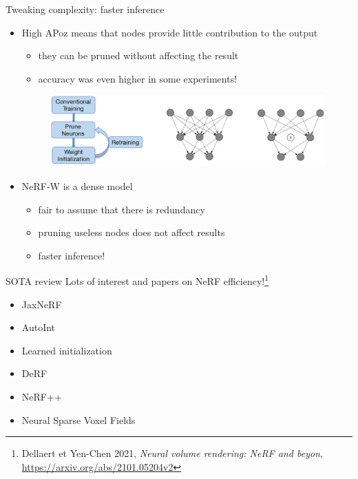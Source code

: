 \documentclass[aspectratio=1610]{beamer}
\begin{document}
\begin{frame}{Tweaking complexity: faster inference}
    \begin{itemize}
        \item High APoz means that nodes provide little contribution to the output
        \begin{itemize}
            \item they can be pruned without affecting the result
            \item accuracy was even higher in some experiments!
        \end{itemize}
        \bigskip
        \begin{figure}
            \includegraphics[width=.7\textwidth]{retrain.png}
        \end{figure}
        \bigskip
        \item NeRF-W is a dense model
        \begin{itemize}
            \item fair to assume that there is redundancy
            \item pruning useless nodes does not affect results
            \item faster inference!
        \end{itemize}
    \end{itemize}
\end{frame}

\begin{frame}{SOTA review}
    Lots of interest and papers on NeRF efficiency!\footnote{Dellaert et Yen-Chen 2021, \emph{Neural volume rendering: NeRF and beyon}, \url{https://arxiv.org/abs/2101.05204v2}}
    \bigskip
    \begin{itemize}
        \item JaxNeRF
        \item AutoInt
        \item Learned initialization
        \item DeRF
        \item NeRF++
        \item Neural Sparse Voxel Fields
    \end{itemize}
\end{frame}
\end{document}
